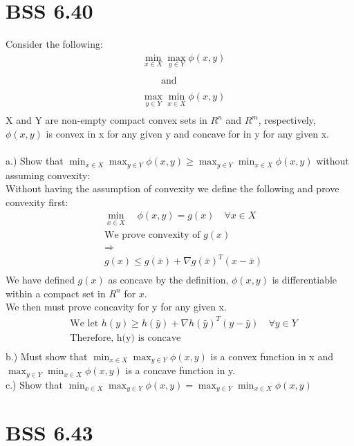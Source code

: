 \documentclass[12pt]{article}
\begin{document}
\section{BSS 6.40}
    Consider the following: \\
        \begin{align*}
            &\min_{x \in X} \max_{y \in Y} \phi(x,y)\\\\
            &\quad \quad \text{and}\\\\
            &\max_{y \in Y} \min_{x \in X} \phi(x,y)\\
        \end{align*}
    X and Y are non-empty compact convex sets in $R^n$ and $R^m$, respectively, $\phi (x,y)$ is convex in x for any given y and concave for in y for any given x.\\\\
    a.) Show that $\min_{x \in X} \max_{y \in Y} \phi(x,y) \geq \max_{y \in Y} \min_{x \in X} \phi(x,y)$ without assuming convexity:\\
    Without having the assumption of convexity we define the following and prove convexity first:\\
        \begin{align*}
            &\min_{x \in X} \quad \phi(x,y) = g(x) \quad \forall x \in X\\
            &\text{We prove convexity of }g(x)\\
            &\Longrightarrow\\
            &g(x) \leq g(\bar x) + \nabla g(\bar x)^T (x- \bar x)\\
        \end{align*}
    We have defined $g(x)$ as concave by the definition, $\phi (x,y)$ is differentiable within a compact set in $R^n$ for $x$. \\
    We then must prove concavity for y for any given x.\\
        \begin{align*}
            &\text{We let }h(y) \geq h(\bar y) + \nabla h(\bar y)^T (y - \bar y) \quad \forall y \in Y\\
            &\text{Therefore, h(y) is concave}\\
        \end{align*}
    b.) Must show that $\min_{x \in X} \max_{y \in Y} \phi(x,y)$ is a convex function in x and $\max_{y \in Y} \min_{x \in X} \phi(x,y)$ is a concave function in y.\\
    c.) Show that $\min_{x \in X} \max_{y \in Y} \phi(x,y) = \max_{y \in Y} \min_{x \in X} \phi(x,y)$\\
\section{BSS 6.43}
\end{document}
